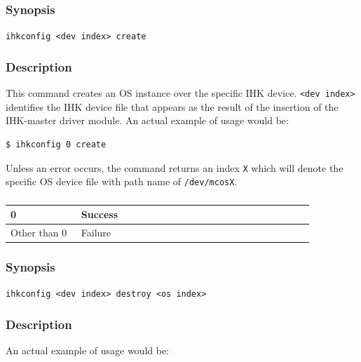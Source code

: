 \documentclass[twoside,11pt,fleqn]{book}
\begin{document}
\subsubsection{}
\subsubsection*{Synopsis}{\quad} \texttt{ihkconfig <dev index> create}
\subsubsection*{Description}{\quad}
This command creates an OS instance over the specific IHK device.
\texttt{<dev index>} identifies the IHK device file that appears as the result of the insertion of the IHK-master driver module.
An actual example of usage would be:

\begin{verbatim}
$ ihkconfig 0 create
\end{verbatim}

Unless an error occurs, the command returns an index \texttt{X} which will denote the
specific OS device file with path name of \texttt{/dev/mcosX}.

\subsubsection*{}
\begin{table}[!h]
\footnotesize
\begin{tabular}{|p{0.20\linewidth}|p{0.66\linewidth}|} \hline
0&Success\\ \hline
Other than 0&Failure\\ \hline
\end{tabular}
\vspace{-0em}
\end{table}
\FloatBarrier

\subsubsection{}
\subsubsection*{Synopsis}{\quad} \texttt{ihkconfig <dev index> destroy <os index>}
\subsubsection*{Description}{\quad}
An actual example of usage would be:
\end{document}
